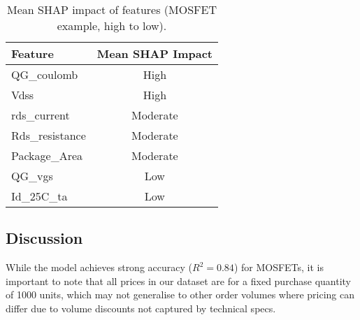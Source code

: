 \begin{table}[H]
\centering
\caption{Mean SHAP impact of features (MOSFET example, high to low).}
\label{tab:mosfet-shap}
\begin{tabular}{lc}
\toprule
Feature & Mean SHAP Impact \\
\midrule
QG\_coulomb         & High \\
Vdss                & High \\
rds\_current        & Moderate \\
Rds\_resistance     & Moderate \\
Package\_Area       & Moderate \\
QG\_vgs             & Low \\
Id\_25C\_ta         & Low \\
\bottomrule
\end{tabular}
\end{table}


\subsection{Discussion}
While the model achieves strong accuracy ($R^2 = 0.84$) for MOSFETs, it is important to note that all prices in our dataset are for a fixed purchase quantity of 1000 units, which may not generalise to other order volumes where pricing can differ due to volume discounts not captured by technical specs.

